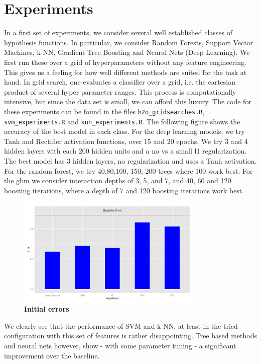 \documentclass[paper=a4, fontsize=12pt]{scrartcl}
\numberwithin{equation}{section}
\numberwithin{figure}{section}
\numberwithin{table}{section}
\begin{document}
\section{Experiments}
In a first set of experiments, we consider several well established classes of hypothesis functions. In particular, we consider Random Forests, Support Vector Machines, k-NN,  Gradient Tree Boosting and Neural Nets (Deep Learning). 
We first run these over a grid of hyperparameters without any feature engineering. This gives us a feeling for how well different methods are suited for the task at hand. In grid search, one evaluates a classifier over a grid, i.e. the cartesian product of several hyper parameter ranges. This process is computationally intensive, but since the data set is small, we can afford this luxury. The code for these experiments can be found in the files \lstinline{h2o_gridsearches.R}, \lstinline{svm_experiments.R} and \lstinline{knn_experiments.R}. The following figure shows the accuracy of the best model in each class. For the deep learning models, we try Tanh and Rectifier activation functions, over 15 and 20 epochs. We try 3 and 4 hidden layers with each 200 hidden units and a no vs a small l1 regularization. The best model has 3 hidden layers, no regularization and uses a Tanh activation. For the random forest, we try 40,80,100, 150, 200 trees where 100 work best. For the gbm we consider interaction depths of 3, 5, and 7, and 40, 60 and 120 boosting iterations, where a depth of 7 and 120 boosting iterations work best. 

\begin{figure}[H]
    \centering
    \includegraphics[width=0.8\textwidth]{erorrs.png}
    \caption{ \textbf{Initial errors}}
    \label{fig:errors}
\end{figure}

We clearly see that the performance of SVM and k-NN, at least in the tried configuration with this set of features is rather disappointing. Tree based methods  and neural nets however, show - with some parameter tuning - a significant improvement over the baseline. 
 
\end{document}
